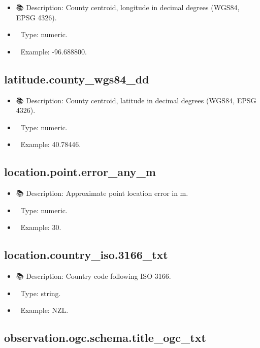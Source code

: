 \documentclass[
  letterpaper,
  DIV=11,
  numbers=noendperiod]{scrreprt}
\providecommand{\tightlist}{%
  \setlength{\itemsep}{0pt}\setlength{\parskip}{0pt}}\usepackage{longtable,booktabs,array}
\begin{document}
\begin{itemize}
\tightlist
\item
  📚 Description: County centroid, longitude in decimal degrees (WGS84,
  EPSG 4326).
\item
  🔢 Type: numeric.
\item
  📖 Example: -96.688800.
\end{itemize}

\subsection{latitude.county\_wgs84\_dd}\label{latitude.county_wgs84_dd}

\begin{itemize}
\tightlist
\item
  📚 Description: County centroid, latitude in decimal degrees (WGS84,
  EPSG 4326).
\item
  🔢 Type: numeric.
\item
  📖 Example: 40.78446.
\end{itemize}

\subsection{location.point.error\_any\_m}\label{location.point.error_any_m}

\begin{itemize}
\tightlist
\item
  📚 Description: Approximate point location error in m.
\item
  🔢 Type: numeric.
\item
  📖 Example: 30.
\end{itemize}

\subsection{location.country\_iso.3166\_txt}\label{location.country_iso.3166_txt}

\begin{itemize}
\tightlist
\item
  📚 Description: Country code following ISO 3166.
\item
  🔢 Type: string.
\item
  📖 Example: NZL.
\end{itemize}

\subsection{observation.ogc.schema.title\_ogc\_txt}\label{observation.ogc.schema.title_ogc_txt}
\end{document}
